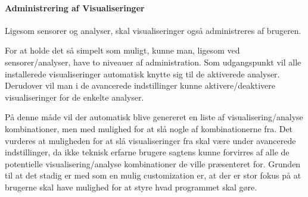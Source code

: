 \paragraph{Administrering af Visualiseringer}
Ligesom sensorer og analyser, skal visualiseringer også administreres af brugeren.

For at holde det så simpelt som muligt, kunne man, ligesom ved sensorer/analyser, have to niveauer af administration.
Som udgangspunkt vil alle installerede visualiseringer automatisk knytte sig til de aktiverede analyser.
Derudover vil man i de avancerede indstillinger kunne aktivere/deaktivere visualiseringer for de enkelte analyser.

På denne måde vil der automatisk blive genereret en liste af visualisering/analyse kombinationer, men med mulighed for at slå nogle af kombinationerne fra.
Det vurderes at muligheden for at slå visualiseringer fra skal være under avancerede indstillinger, da ikke teknisk erfarne brugere sagtens kunne forvirres af alle de potentielle visualisering/analyse kombinationer de ville præsenteret for.
Grunden til at det stadig er med som en mulig customization er, at der er stor fokus på at brugerne skal have mulighed for at styre hvad programmet skal gøre. 
